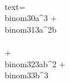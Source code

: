 \documentclass[preview]{standalone}
\begin{document}
\begin{center}
\quad\\text{= \quad\\binom{3}{0}a^3 + \quad\\binom{3}{1}3a^2b \quad\\\quad\\ + \quad\\binom{3}{2}3ab^2 + \quad\\binom{3}{3}b^3}
\end{center}
\end{document}
